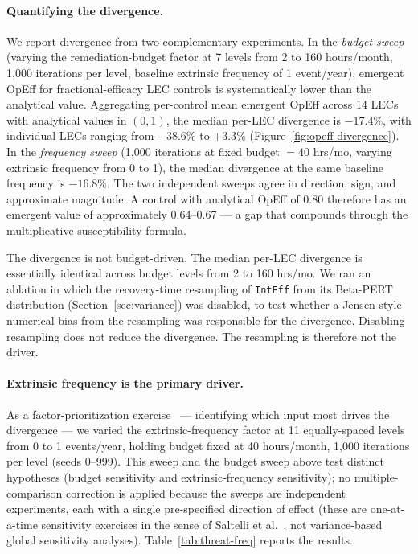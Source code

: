 \documentclass[11pt,a4paper]{article}
\begin{document}
\paragraph{Quantifying the divergence.} We report divergence from two complementary experiments. In the \emph{budget sweep} (varying the remediation-budget factor at 7 levels from 2 to 160 hours/month, 1{,}000 iterations per level, baseline extrinsic frequency of 1 event/year), emergent OpEff for fractional-efficacy LEC controls is systematically lower than the analytical value. Aggregating per-control mean emergent OpEff across 14 LECs with analytical values in $(0, 1)$, the median per-LEC divergence is $-17.4\%$, with individual LECs ranging from $-38.6\%$ to $+3.3\%$ (Figure~\ref{fig:opeff-divergence}). In the \emph{frequency sweep} (1{,}000 iterations at fixed budget $=40$ hrs/mo, varying extrinsic frequency from 0 to 1), the median divergence at the same baseline frequency is $-16.8\%$. The two independent sweeps agree in direction, sign, and approximate magnitude. A control with analytical OpEff of 0.80 therefore has an emergent value of approximately 0.64--0.67 --- a gap that compounds through the multiplicative susceptibility formula.

The divergence is not budget-driven. The median per-LEC divergence is essentially identical across budget levels from 2 to 160 hrs/mo. We ran an ablation in which the recovery-time resampling of \texttt{IntEff} from its Beta-PERT distribution (Section~\ref{sec:variance}) was disabled, to test whether a Jensen-style numerical bias from the resampling was responsible for the divergence. Disabling resampling does not reduce the divergence. The resampling is therefore not the driver.

\paragraph{Extrinsic frequency is the primary driver.} As a factor-prioritization exercise~\citep{Saltelli2008} --- identifying which input most drives the divergence --- we varied the extrinsic-frequency factor at 11 equally-spaced levels from 0 to 1 events/year, holding budget fixed at 40 hours/month, 1{,}000 iterations per level (seeds 0--999). This sweep and the budget sweep above test distinct hypotheses (budget sensitivity and extrinsic-frequency sensitivity); no multiple-comparison correction is applied because the sweeps are independent experiments, each with a single pre-specified direction of effect (these are one-at-a-time sensitivity exercises in the sense of Saltelli et al.~\citep{Saltelli2008}, not variance-based global sensitivity analyses). Table~\ref{tab:threat-freq} reports the results.
\end{document}
